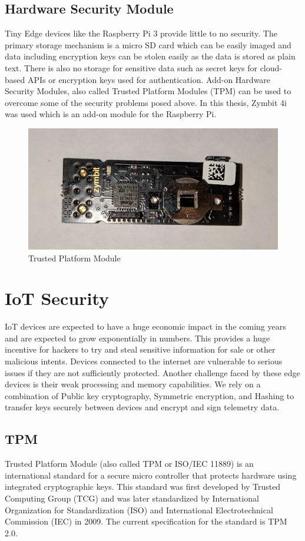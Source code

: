 \documentclass[11pt,openright]{report}
\begin{document}
\subsection{Hardware Security Module}
Tiny Edge devices like the Raspberry Pi 3 provide little to no security.
The primary storage mechanism is a micro SD card which can be easily imaged and data including encryption keys can be stolen easily as the data is stored as plain text. There is also no storage for sensitive data such as secret keys for cloud-based APIs or encryption keys used for authentication. Add-on Hardware Security Modules, also called Trusted Platform Modules (TPM) can be used to overcome some of the security problems posed above. In this thesis, Zymbit 4i was used which is an add-on module for the Raspberry Pi.

\begin{figure}
    \centering
    \includegraphics[scale=0.1]{images/tpm.jpg}
    \caption{Trusted Platform Module}
    \label{fig:tpm}
\end{figure}


\section{IoT Security}
IoT devices are expected to have a huge economic impact in the coming years and are expected to grow exponentially in numbers. This provides a huge incentive for hackers to try and steal sensitive information for sale or other malicious intents. Devices connected to the internet are vulnerable to serious issues if they are not sufficiently protected. Another challenge faced by these edge devices is their weak processing and memory capabilities. We rely on a combination of Public key cryptography, Symmetric encryption, and Hashing to transfer keys securely between devices and encrypt and sign telemetry data. 

\subsection{TPM}
Trusted Platform Module (also called TPM or ISO/IEC 11889) \cite{article} is an international standard for a secure micro controller that protects hardware using integrated cryptographic keys. This standard was first developed by Trusted Computing Group (TCG) and was later standardized by International Organization for Standardization (ISO) and International Electrotechnical Commission (IEC) in 2009. The current specification for the standard is TPM 2.0.
\end{document}
